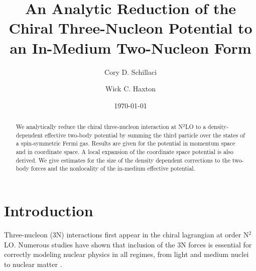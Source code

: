 \documentclass[%
 preprint,
 amsmath,amssymb,
 aps,
]{revtex4-1}
\begin{document}

\title{An Analytic Reduction of the Chiral Three-Nucleon Potential to an In-Medium Two-Nucleon Form}%

\author{Cory D. Schillaci}
\author{Wick C. Haxton}%
%

\date{\today}%

\begin{abstract}
We analytically reduce the chiral three-nucleon interaction at N$^2$LO to a density-dependent effective two-body potential by summing the third particle over the states of a spin-symmetric Fermi gas. Results are given for the potential in momentum space and in coordinate space. A local expansion of the coordinate space potential is also derived. We give estimates for the size of the density dependent corrections to the two-body forces and the nonlocality of the in-medium effective potential.
\end{abstract}

\maketitle


\section{\label{sec:level1}Introduction}

Three-nucleon (3N) interactions first appear in the chiral lagrangian at order N$^2$LO. Numerous studies have shown that inclusion of the 3N forces is essential for correctly modeling nuclear physics in all regimes, from light and medium nuclei \cite{PhysRevLett.99.042501,0954-3899-39-8-085111} to nuclear matter \cite{PhysRevC.82.014314,PhysRevC.83.031301}.
\end{document}
